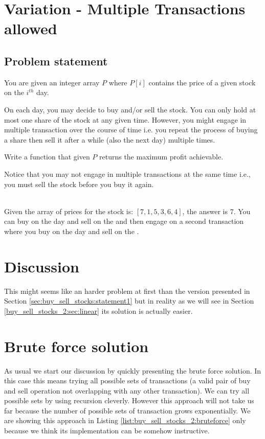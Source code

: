 \section{Variation - Multiple Transactions allowed}
\label{sec:buy_sell_stocks:multiple_transaction}

\subsection{Problem statement}
\begin{exercise}
	You are given an integer array $P$ where $P[i]$ contains the price of a given stock on the $i^{th}$ day.

	On each day, you may decide to buy and/or sell the stock. 
	You can only hold at most one share of the stock at any given time.
	However, you might engage in multiple transaction over the course of time i.e. you repeat the process of buying a share then sell it after a while (also the next day) multiple times.
	
	Write a function that given $P$ returns the maximum profit achievable.

	Notice that you may not engage in multiple transactions at the same time i.e., you must sell the stock before you buy it again.
	\begin{example}
	\label{ex:buy_sell_stocks_2:exmaple1}
		\hfill \\
		Given the array of prices for the stock is: $[7,1,5,3,6,4]$, the answer is $7$. 
		You can buy on the  day and sell on the  and then engage on a second transaction where you buy on the  day and sell on the .
	\end{example}

\end{exercise}


\section{Discussion}
\label{buy_sell_stocks_2:sec:discussion}
This might seems like an harder problem at first than the version presented in Section \ref{sec:buy_sell_stocks:statement1} but in reality as we will see in Section \ref{buy_sell_stocks_2:sec:linear} its solution is actually easier.

\section{Brute force solution}
\label{buy_sell_stocks_2:sec:bruteforce}
As usual we start our discussion by quickly presenting the brute force solution. In this case this means trying all possible sets of transactions (a valid pair of buy and sell operation not overlapping with any other transaction). We can try all possible sets by using recursion cleverly. However this approach will not take us far because the number of possible sets of transaction grows exponentially.
We are showing this approach in Listing \ref{list:buy_sell_stocks_2:bruteforce}  only because we think its implementation can be somehow instructive.

